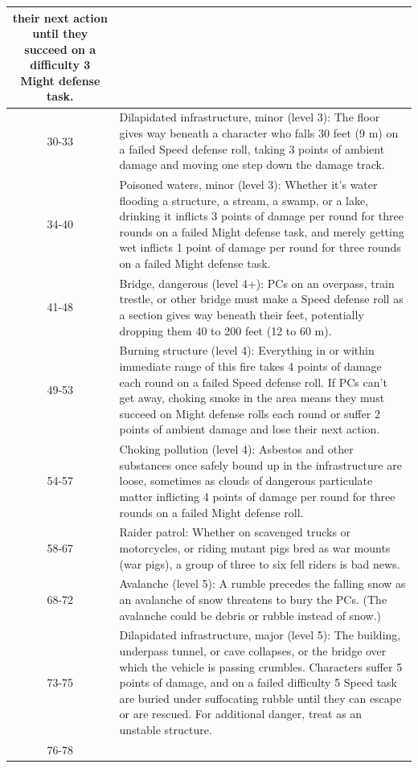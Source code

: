 \begin{longtable}{| c | p{15cm} |}
their next action until they succeed on a difficulty 3
Might defense task. \\ \hline
30-33 &
Dilapidated infrastructure, minor (level 3):
The floor gives way beneath a character who falls
30 feet (9 m) on a failed Speed defense roll, taking
3 points of ambient damage and moving one step
down the damage track. \\ \hline
34-40 &
Poisoned waters, minor (level 3): Whether
it’s water flooding a structure, a stream, a swamp,
or a lake, drinking it inflicts 3 points of damage per
round for three rounds on a failed Might defense
task, and merely getting wet inflicts 1 point of
damage per round for three rounds on a failed
Might defense task. \\ \hline
41-48 &
Bridge, dangerous (level 4+): PCs on an
overpass, train trestle, or other bridge must make a
Speed defense roll as a section gives way beneath
their feet, potentially dropping them 40 to 200 feet
(12 to 60 m). \\ \hline
49-53 &
Burning structure (level 4): Everything in or
within immediate range of this fire takes 4 points of
damage each round on a failed Speed defense roll.
If PCs can’t get away, choking smoke in the area
means they must succeed on Might defense rolls
each round or suffer 2 points of ambient damage
and lose their next action. \\ \hline
54-57 &
Choking pollution (level 4): Asbestos and
other substances once safely bound up in the
infrastructure are loose, sometimes as clouds of
dangerous particulate matter inflicting 4 points
of damage per round for three rounds on a failed
Might defense roll. \\ \hline
58-67 &
Raider patrol: Whether on scavenged trucks
or motorcycles, or riding mutant pigs bred as war
mounts (war pigs), a group of three to six fell riders
is bad news. \\ \hline
68-72 &
Avalanche (level 5): A rumble precedes the
falling snow as an avalanche of snow threatens to
bury the PCs. (The avalanche could be debris or
rubble instead of snow.) \\ \hline
73-75 &
Dilapidated infrastructure, major (level 5):
The building, underpass tunnel, or cave collapses,
or the bridge over which the vehicle is passing
crumbles. Characters suffer 5 points of damage,
and on a failed difficulty 5 Speed task are buried
under suffocating rubble until they can escape
or are rescued. For additional danger, treat as an
unstable structure. \\ \hline
76-78 &

\end{longtable}
